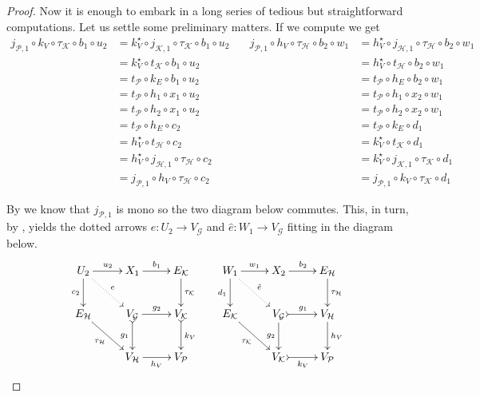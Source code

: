 \documentclass[runningheads,envcountsect]{llncs}
\def\E{\textbf {\textup{E}}}
\begin{document}
\begin{proof}
Now it is enough to embark in a long series of tedious but straightforward computations. Let us settle some preliminary matters. If we compute we get
\tiny
\[	\begin{split}
	j_{\mathcal{P},1}\circ k_V\circ \tau_{\mathcal{K}}\circ b_1\circ u_2&=k^\star_V \circ j_{\mathcal{K},1}\circ \tau_{\mathcal{K}}	\circ b_1\circ u_2\\&=k^\star_V\circ t_\mathcal{K}\circ b_1\circ u_2\\&=t_{\mathcal{P}}\circ k_E\circ b_1\circ u_2\\&=t_{\mathcal{P}}\circ h_1\circ x_1\circ u_2\\&=t_{\mathcal{P}}\circ h_2\circ x_1\circ u_2\\&=t_{\mathcal{P}}\circ h_E\circ c_2\\&=h^{\star}_V\circ t_{\mathcal{H}}\circ c_2\\&=h^\star_{V}\circ j_{\mathcal{{H}}, 1}\circ \tau_{\mathcal{H}}\circ c_2\\&=j_{\mathcal{P},1}\circ h_V\circ \tau_\mathcal{{H}}\circ c_2
\end{split} \quad 	\begin{split}
		j_{\mathcal{P},1}\circ h_V\circ \tau_{\mathcal{H}}\circ b_2\circ w_1&=h^\star_V \circ j_{\mathcal{H},1}\circ \tau_{\mathcal{H}}	\circ b_2\circ w_1\\&=h^\star_V\circ t_\mathcal{H}\circ b_2\circ w_1\\&=t_{\mathcal{P}}\circ h_E\circ b_2\circ w_1\\&=t_{\mathcal{P}}\circ h_1\circ x_2\circ w_1\\&=t_{\mathcal{P}}\circ h_2\circ x_2\circ w_1\\&=t_{\mathcal{P}}\circ k_E\circ d_1\\&=k^{\star}_V\circ t_{\mathcal{K}}\circ d_1\\&=k^\star_{V}\circ j_{\mathcal{{K}}, 1}\circ \tau_{\mathcal{K}}\circ d_1\\&=j_{\mathcal{P},1}\circ k_V\circ \tau_\mathcal{{K}}\circ d_1
\end{split} \]

\normalsize

By  we know that $j_{\mathcal{P},1}$ is mono so the two diagram below commutes. This, in turn, by , yields the dotted arrows $e\colon U_2\to V_{\mathcal{{G}}}$ and $\hat{e}\colon W_1\to V_{\mathcal{{G}}}$ fitting in the diagram below.
\[\xymatrix{U_2  \ar[d]_{c_2}\ar@{.>}[dr]^{e}\ar[r]^{u_2} & X_1 \ar[r]^{b_1} & E_{\mathcal{K}} \ar[d]^{\tau_{\mathcal{{K}}}} & W_1  \ar[d]_{d_1}\ar@{.>}[dr]^{\hat{e}}\ar[r]^{w_1} & X_2 \ar[r]^{b_2} & E_{\mathcal{H}} \ar[d]^{\tau_{\mathcal{{H}}}}  \\E_{\mathcal{H}} \ar[dr]_{\tau_{\mathcal{{H}}}}&V_{\mathcal{G}}  \ar[r]^{g_2} \ar@{>->}[d]_{g_1}& V_{\mathcal{K}} \ar@{>->}[d]^{k_V} & E_{\mathcal{K}} \ar[dr]_{\tau_{\mathcal{{K}}}}&V_{\mathcal{G}}  \ar@{>->}[r]^{g_1} \ar[d]_{g_2}& V_{\mathcal{H}} \ar[d]^{h_V}\\ & V_{\mathcal{{H}}} \ar[r]_{h_V} & V_{\mathcal{P}} & & V_{\mathcal{{K}}} \ar@{>->}[r]_{k_V} & V_{\mathcal{P}}}\]


\end{proof}
\end{document}
